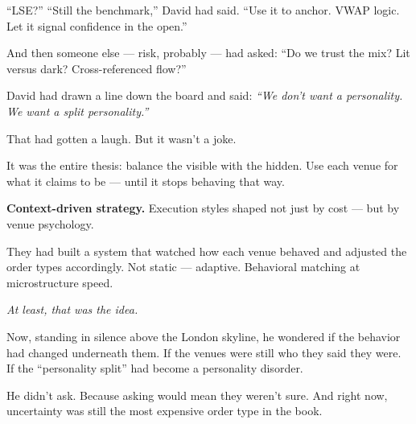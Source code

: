 “LSE?”
“Still the benchmark,” David had said. “Use it to anchor. VWAP logic. Let it signal confidence in the open.”

And then someone else — risk, probably — had asked:
“Do we trust the mix? Lit versus dark? Cross-referenced flow?”

David had drawn a line down the board and said:
\textit{“We don’t want a personality. We want a split personality.”}

That had gotten a laugh. But it wasn’t a joke.

It was the entire thesis: balance the visible with the hidden.
Use each venue for what it claims to be — until it stops behaving that way.

\textbf{Context-driven strategy.}
Execution styles shaped not just by cost — but by venue psychology.

They had built a system that watched how each venue behaved
and adjusted the order types accordingly.
Not static — adaptive. Behavioral matching at microstructure speed.

\textit{At least, that was the idea.}

Now, standing in silence above the London skyline,
he wondered if the behavior had changed underneath them.
If the venues were still who they said they were.
If the “personality split” had become a personality disorder.

He didn’t ask.
Because asking would mean they weren’t sure.
And right now, uncertainty was still the most expensive order type in the book.

\renewcommand{\arraystretch}{1.4}  %

\begin{table}[H]
\centering
{}
\caption{Mapping of Venues to Execution Styles, Behaviors, and Risk Profiles}
\end{table}
  



